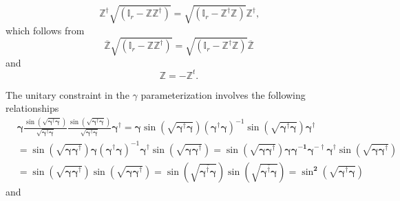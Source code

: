 \documentclass[aps, preprint]{revtex4}
\begin{document}
\begin{equation}\mathbb{Z}^{ \dag } \sqrt{\left (\mathbb{I}_{r} -\mathbb{Z} \mathbb{Z}^{ \dag }\right )} =\sqrt{\left (\mathbb{I}_{r} -\mathbb{Z}^{ \dag } \mathbb{Z}\right )} \mathbb{Z}^{ \dag }\text{,}
\end{equation}which follows from
\begin{equation}\overline{\mathbb{Z}} \sqrt{\left (\mathbb{I}_{r} -\mathbb{Z} \mathbb{Z}^{ \dag }\right )} =\sqrt{\left (\mathbb{I}_{r} -\mathbb{Z}^{ \dag } \mathbb{Z}\right )} \overline{\mathbb{Z}}
\end{equation}and
\begin{equation}\mathbb{Z} = -\mathbb{Z}^{t}\text{.}
\end{equation}

The unitary constraint in the $\gamma $ parameterization involves the following relationships
\begin{align} & \mathbf{\gamma } \frac{\sin  \left (\sqrt{\mathbf{\gamma }^{ \dag } \mathbf{\gamma }}\right )}{\sqrt{\mathbf{\gamma }^{ \dag } \mathbf{\gamma }}} \frac{\sin  \left (\sqrt{\mathbf{\gamma }^{ \dag } \mathbf{\gamma }}\right )}{\sqrt{\mathbf{\gamma }^{ \dag } \mathbf{\gamma }}} \mathbf{\gamma }^{ \dag } =\mathbf{\gamma }\sin \left (\sqrt{\mathbf{\gamma }^{ \dag } \mathbf{\gamma }}\right )\left (\mathbf{\gamma }^{ \dag } \mathbf{\gamma }\right )^{ -1}\sin \left (\sqrt{\mathbf{\gamma }^{ \dag } \mathbf{\gamma }}\right )\mathbf{\gamma }^{ \dag } \\
 &  =\sin \left (\sqrt{\mathbf{\gamma } \mathbf{\gamma }^{ \dag }}\right )\mathbf{\gamma } \left (\mathbf{\gamma }^{ \dag } \mathbf{\gamma }\right )^{ -1} \mathbf{\gamma }^{ \dag }\sin \left (\sqrt{\mathbf{\gamma } \mathbf{\gamma }^{ \dag }}\right ) =\sin \left (\sqrt{\mathbf{\gamma } \mathbf{\gamma }^{ \dag }}\right )\mathbf{\gamma } \mathbf{\gamma }^{ -\mathbf{1}} \mathbf{\gamma }^{ - \dag } \mathbf{\gamma }^{ \dag }\sin \left (\sqrt{\mathbf{\gamma } \mathbf{\gamma }^{ \dag }}\right ) \\
 &  =\sin \left (\sqrt{\mathbf{\gamma } \mathbf{\gamma }^{ \dag }}\right )\sin \left (\sqrt{\mathbf{\gamma } \mathbf{\gamma }^{ \dag }}\right ) =\sin \left (\sqrt{\overline{\mathbf{\gamma }^{ \dag } \mathbf{\gamma }}}\right )\sin \left (\sqrt{\overline{\mathbf{\gamma }^{ \dag } \mathbf{\gamma }}}\right ) =\sin ^{\mathbf{2}}\left (\sqrt{\mathbf{\gamma }^{ \dag } \mathbf{\gamma }}\right )\end{align}and
\end{document}
